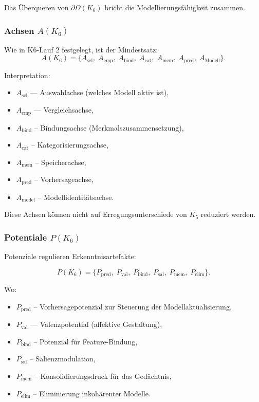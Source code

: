 Das Überqueren von $\partial \Omega(K_6)$ bricht die Modellierungsfähigkeit zusammen.

\subsubsection{Achsen \texorpdfstring{$A(K_6)$}{A(K_6)}}

Wie in K6-Lauf 2 festgelegt, ist der Mindestsatz:
\[
A(K_6) = \{
A_{\mathrm{sel}},\;
A_{\mathrm{cmp}},\;
A_{\mathrm{bind}},\;
A_{\mathrm{cat}},\;
A_{\mathrm{mem}},\;
A_{\mathrm{pred}},\;
A_{\mathrm{Modell}}
\}.
\]

Interpretation:
\begin{itemize}
    \item $A_{\mathrm{sel}}$ — Auswahlachse (welches Modell aktiv ist),
    \item $A_{\mathrm{cmp}}$ — Vergleichsachse,
    \item $A_{\mathrm{bind}}$ – Bindungsachse (Merkmalszusammensetzung),
    \item $A_{\mathrm{cat}}$ – Kategorisierungsachse,
    \item $A_{\mathrm{mem}}$ – Speicherachse,
    \item $A_{\mathrm{pred}}$ – Vorhersageachse,
    \item $A_{\mathrm{model}}$ – Modellidentitätsachse.
\end{itemize}

Diese Achsen können nicht auf Erregungsunterschiede von $K_5$ reduziert werden.

\subsubsection{Potentiale \texorpdfstring{$P(K_6)$}{P(K_6)}}

Potenziale regulieren Erkenntnisartefakte:

\[
P(K_6)=
\{
P_{\mathrm{pred}},\;
P_{\mathrm{val}},\;
P_{\mathrm{bind}},\;
P_{\mathrm{sal}},\;
P_{\mathrm{mem}},\;
P_{\mathrm{elim}}
\}.
\]

Wo:
\begin{itemize}
    \item $P_{\mathrm{pred}}$ – Vorhersagepotenzial zur Steuerung der Modellaktualisierung,
    \item $P_{\mathrm{val}}$ — Valenzpotential (affektive Gestaltung),
    \item $P_{\mathrm{bind}}$ – Potenzial für Feature-Bindung,
    \item $P_{\mathrm{sal}}$ – Salienzmodulation,
    \item $P_{\mathrm{mem}}$ – Konsolidierungsdruck für das Gedächtnis,
    \item $P_{\mathrm{elim}}$ – Eliminierung inkohärenter Modelle.
\end{itemize}

